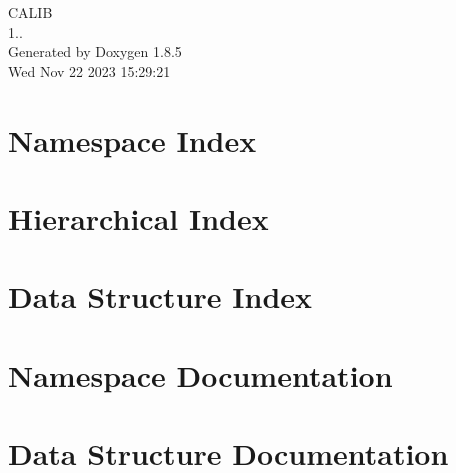 \documentclass[twoside]{book}
\newcommand{\clearemptydoublepage}{%
  \newpage{\pagestyle{empty}\cleardoublepage}%
}
\begin{document}
\begin{titlepage}
\vspace*{7cm}
\begin{center}%
{\Large C\-A\-L\-I\-B \\[1ex]\large 1.. }\\
\vspace*{1cm}
{\large Generated by Doxygen 1.8.5}\\
\vspace*{0.5cm}
{\small Wed Nov 22 2023 15:29:21}\\
\end{center}
\end{titlepage}
\clearemptydoublepage
\tableofcontents
\clearemptydoublepage
{}

\chapter{Namespace Index}

\chapter{Hierarchical Index}

\chapter{Data Structure Index}

\chapter{Namespace Documentation}

\chapter{Data Structure Documentation}




























\newpage
{}
{}
\printindex
\end{document}
